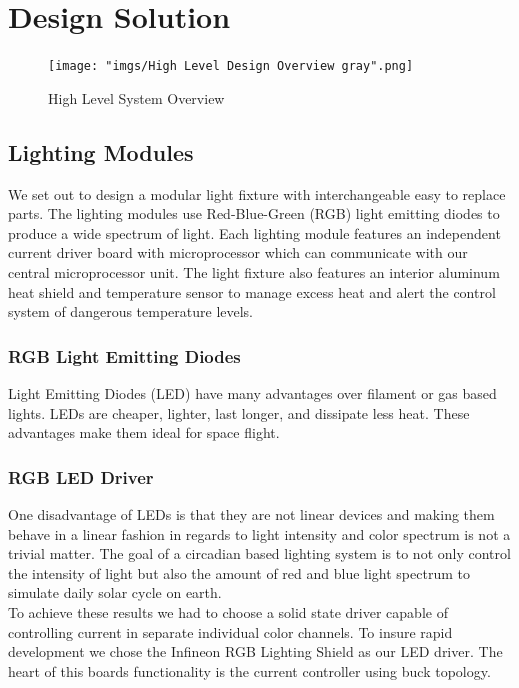 \documentclass[12pt,a4paper]{report}
\begin{document}
\section{Design Solution}

\begin{figure}[H]
	\centering
	\texttt{[image: "imgs/High Level Design Overview gray".png]}\par			\vspace{0.1cm}
	\caption{High Level System Overview}
\end{figure}
\subsection{Lighting Modules}
We set out to design a modular light fixture with interchangeable easy to replace parts. The lighting modules use Red-Blue-Green (RGB) light emitting diodes to produce a wide spectrum of light. Each lighting module features an independent current driver board with microprocessor which can communicate with our central microprocessor unit. The light fixture also features an interior aluminum heat shield and temperature sensor to manage excess heat and alert the control system of dangerous temperature levels. 
 
\subsubsection{RGB Light Emitting Diodes}
Light Emitting Diodes (LED) have many advantages over filament or gas based lights. LEDs are cheaper, lighter, last longer, and dissipate less heat. These advantages make them ideal for space flight.   

\subsubsection{RGB LED Driver}
One disadvantage of LEDs is that they are not linear devices and making them behave in a linear fashion in regards to light intensity and color spectrum is not a trivial matter. The goal of a circadian based lighting system is to not only control the intensity of light but also the amount of red and blue light spectrum to simulate daily solar cycle on earth. \\ \linebreak 
To achieve these results we had to choose a solid state driver capable of controlling current in separate individual color channels. To insure rapid development we chose the Infineon RGB Lighting Shield as our LED driver. The heart of this boards functionality is the current controller using buck topology. 
\end{document}
